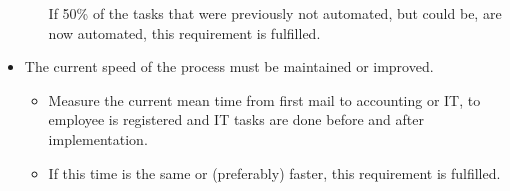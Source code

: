 \begin{itemize}
\begin{itemize}
If 50\% of the tasks that were previously not automated, but could be, are now automated, this requirement is fulfilled.
\end{itemize}
\item
The current speed of the process must be maintained or improved.
\begin{itemize}
\item
Measure the current mean time from first mail to accounting or IT, to employee is registered and IT tasks are done before and after implementation.
\item
If this time is the same or (preferably) faster, this requirement is fulfilled.
\end{itemize}
\end{itemize}